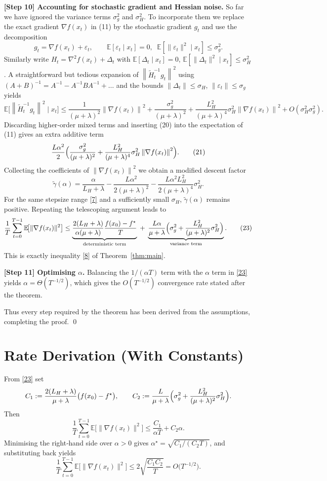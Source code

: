 \documentclass{article}
\newcommand{\EE}{\mathbb{E}}
\newcommand{\norm}[1]{\left\|#1\right\|}
\begin{document}
\noindent\textbf{[Step 10] Accounting for stochastic gradient and Hessian noise.}
So far we have ignored the variance terms $\sigma_g^{2}$ and $\sigma_H^{2}$.
To incorporate them we replace the exact gradient $\nabla f(x_t)$ in (11) by the
stochastic gradient $g_t$ and use the decomposition
\[
g_t = \nabla f(x_t) + \varepsilon_t,\qquad
\EE[\varepsilon_t\mid x_t]=0,\;\;
\EE[\|\varepsilon_t\|^{2}\mid x_t]\le\sigma_g^{2}.
\]
Similarly write $H_t = \nabla^{2}f(x_t)+\Delta_t$ with
$\EE[\Delta_t\mid x_t]=0$, $\EE[\|\Delta_t\|^{2}\mid x_t]\le\sigma_H^{2}$.
A straightforward but tedious expansion of
$\norm{\tilde H_t^{-1}g_t}^{2}$ using $(A+B)^{-1}=A^{-1}-A^{-1}BA^{-1}+ \dots$ and
the bounds $\|\Delta_t\|\le\sigma_H$, $\|\varepsilon_t\|\le\sigma_g$ yields
\[
\EE\!\bigl[\norm{\tilde H_t^{-1}g_t}^{2}\mid x_t\bigr]
\le
\frac{1}{(\mu+\lambda)^{2}}\norm{\nabla f(x_t)}^{2}
+ \frac{\sigma_g^{2}}{(\mu+\lambda)^{2}}
+ \frac{L_H^{2}}{(\mu+\lambda)^{4}}\sigma_H^{2}\norm{\nabla f(x_t)}^{2}
+ O(\sigma_H^{2}\sigma_g^{2}).
\tag{20}
\]
Discarding higher‑order mixed terms and inserting (20) into the expectation of
(11) gives an extra additive term
\[
\frac{L\alpha^{2}}{2}\Bigl(
\frac{\sigma_g^{2}}{(\mu+\lambda)^{2}}
+\frac{L_H^{2}}{(\mu+\lambda)^{4}}\sigma_H^{2}\norm{\nabla f(x_t)}^{2}
\Bigr).
\tag{21}
\]
Collecting the coefficients of $\norm{\nabla f(x_t)}^{2}$ we obtain a
modified descent factor
\[
\tilde\gamma(\alpha)=
\frac{\alpha}{L_H+\lambda}
-\frac{L\alpha^{2}}{2(\mu+\lambda)^{2}}
-\frac{L\alpha^{2}L_H^{2}}{2(\mu+\lambda)^{4}}\sigma_H^{2}.
\tag{22}
\]
For the same stepsize range \eqref{7} and a sufficiently small $\sigma_H$,
$\tilde\gamma(\alpha)$ remains positive.  Repeating the telescoping argument
leads to
\[
\frac{1}{T}\sum_{t=0}^{T-1}\EE\!\bigl[\|\nabla f(x_t)\|^{2}\bigr]
\le
\underbrace{\frac{2(L_H+\lambda)}{\alpha(\mu+\lambda)}\frac{f(x_0)-f^{\star}}{T}}_{\text{deterministic term}}
\;+\;
\underbrace{\frac{L\alpha}{\mu+\lambda}\Bigl(\sigma_g^{2}
+ \frac{L_H^{2}}{(\mu+\lambda)^{2}}\sigma_H^{2}\Bigr)}_{\text{variance term}}.
\tag{23}
\]
This is exactly inequality \eqref{8} of Theorem~\ref{thm:main}.

\noindent\textbf{[Step 11] Optimising $\alpha$.}
Balancing the $1/(\alpha T)$ term with the $\alpha$ term in \eqref{23} yields
$\alpha = \Theta(T^{-1/2})$, which gives the $O(T^{-1/2})$ convergence rate
stated after the theorem.

Thus every step required by the theorem has been derived from the
assumptions, completing the proof. \qed

\section*{Rate Derivation (With Constants)}
From \eqref{23} set
\[
C_1:=\frac{2(L_H+\lambda)}{\mu+\lambda}\bigl(f(x_0)-f^{\star}\bigr),\qquad
C_2:=\frac{L}{\mu+\lambda}\Bigl(\sigma_g^{2}+ \frac{L_H^{2}}{(\mu+\lambda)^{2}}\sigma_H^{2}\Bigr).
\]
Then
\[
\frac{1}{T}\sum_{t=0}^{T-1}\EE\!\bigl[\|\nabla f(x_t)\|^{2}\bigr]
\le \frac{C_1}{\alpha T}+C_2\alpha .
\]
Minimising the right‑hand side over $\alpha>0$ gives $\alpha^{\star}
=\sqrt{C_1/(C_2 T)}$, and substituting back yields
\[
\frac{1}{T}\sum_{t=0}^{T-1}\EE\!\bigl[\|\nabla f(x_t)\|^{2}\bigr]
\le 2\sqrt{\frac{C_1 C_2}{T}} = O\!\bigl(T^{-1/2}\bigr).
\]
\end{document}
